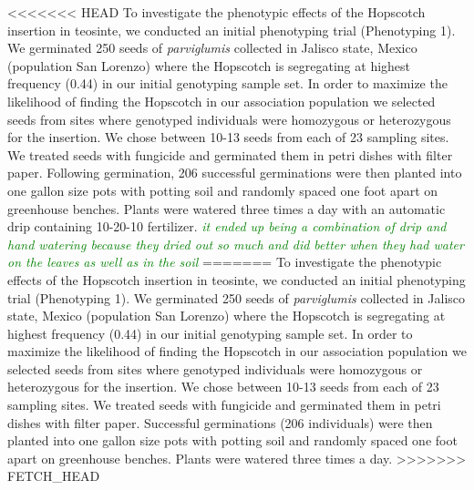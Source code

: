 \documentclass[12pt]{article}
\newcommand{\lev}[1]{\textcolor{green}{\emph{\scriptsize #1}} }
\begin{document}
<<<<<<< HEAD
To investigate the phenotypic effects of the Hopscotch insertion in teosinte, we conducted an initial phenotyping trial (Phenotyping 1). We germinated 250 seeds of \emph{parviglumis} collected in Jalisco state, Mexico (population San Lorenzo) \citep{Hufford2010} where the Hopscotch is segregating at highest frequency (0.44) in our initial genotyping sample set. In order to maximize the likelihood of finding the Hopscotch in our association population we selected seeds from sites where genotyped individuals were homozygous or heterozygous for the insertion. We chose between 10-13 seeds from each of 23 sampling sites. We treated seeds with fungicide and germinated them in petri dishes with filter paper. Following germination, 206 successful germinations were then planted into one gallon size pots with potting soil and randomly spaced one foot apart on greenhouse benches. Plants were watered three times a day with an automatic drip containing 10-20-10 fertilizer. \lev{it ended up being a combination of drip and hand watering because they dried out so much and did better when they had water on the leaves as well as in the soil}
=======
To investigate the phenotypic effects of the Hopscotch insertion in teosinte, we conducted an initial phenotyping trial (Phenotyping 1). We germinated 250 seeds of \emph{parviglumis} collected in Jalisco state, Mexico (population San Lorenzo) \citep{Hufford2010} where the Hopscotch is segregating at highest frequency (0.44) in our initial genotyping sample set. In order to maximize the likelihood of finding the Hopscotch in our association population we selected seeds from sites where genotyped individuals were homozygous or heterozygous for the insertion. We chose between 10-13 seeds from each of 23 sampling sites. We treated seeds with fungicide and germinated them in petri dishes with filter paper. Successful germinations (206 individuals) were then planted into one gallon size pots with potting soil and randomly spaced one foot apart on greenhouse benches. Plants were watered three times a day. 
>>>>>>> FETCH_HEAD
\end{document}
